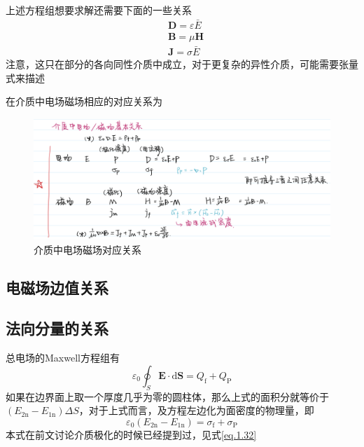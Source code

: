 		上述方程组想要求解还需要下面的一些关系
		\begin{equation}
			\begin{aligned}
			&\boldsymbol{D}=\varepsilon \bar{E} \\
			&\boldsymbol{B}=\mu \boldsymbol{H} \\
			&\boldsymbol{J}=\sigma \bar{E}
			\end{aligned}
		\end{equation}
		注意，这只在部分的各向同性介质中成立，对于更复杂的异性介质，可能需要张量式来描述
		\vspace*{2em}

		在介质中电场磁场相应的对应关系为
		
		\begin{figure}[H]
						\centering  %
						\includegraphics[width=0.9\linewidth]{figs/介质中电场磁场对应关系.jpeg}
						\caption{介质中电场磁场对应关系} %
						\label{fig.介质中电场磁场对应关系}
						\end{figure}
	\subsection{电磁场边值关系}
		\subsection{法向分量的关系}
			总电场的Maxwell方程组有
				\begin{equation}
					\varepsilon_{0} \oint_{S} \boldsymbol{E} \cdot \mathrm{d} \boldsymbol{S}=Q_{\mathrm{f}}+Q_{\mathrm{P}}
				\end{equation}
			如果在边界面上取一个厚度几乎为零的圆柱体，那么上式的面积分就等价于$\left(E_{2 \mathrm{n}}-E_{1 \mathrm{n}}\right) \Delta S$，对于上式而言，及方程左边化为面密度的物理量，即
				\begin{equation}
					\varepsilon_{0}\left(E_{2 \mathrm{n}}-E_{1 \mathrm{n}}\right)=\sigma_{\mathrm{f}}+\sigma_{\mathrm{P}}
				\end{equation}
			本式在前文讨论介质极化的时候已经提到过，见式\ref{eq.1.32}

